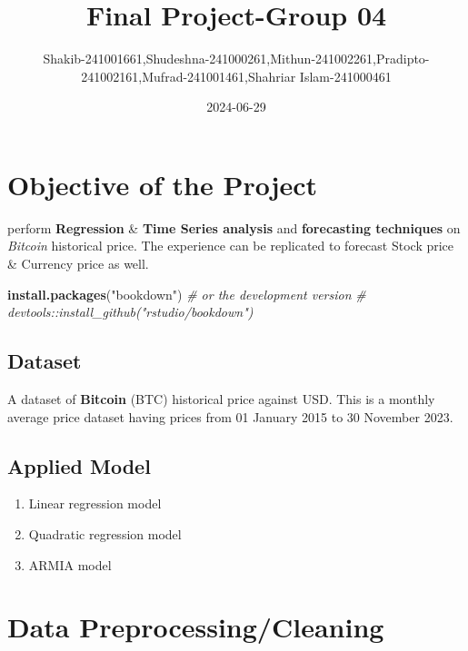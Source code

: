 \documentclass[
]{book}
\title{Final Project-Group 04}
\author{Shakib-241001661,Shudeshna-241000261,Mithun-241002261,Pradipto-241002161,Mufrad-241001461,Shahriar Islam-241000461}
\date{2024-06-29}
\newenvironment{Shaded}{\begin{snugshade}}{\end{snugshade}}
\newcommand{\CommentTok}[1]{\textcolor[rgb]{0.56,0.35,0.01}{\textit{#1}}}
\newcommand{\FunctionTok}[1]{\textcolor[rgb]{0.13,0.29,0.53}{\textbf{#1}}}
\newcommand{\NormalTok}[1]{#1}
\newcommand{\StringTok}[1]{\textcolor[rgb]{0.31,0.60,0.02}{#1}}
\providecommand{\tightlist}{%
  \setlength{\itemsep}{0pt}\setlength{\parskip}{0pt}}
\begin{document}
\maketitle

{
\setcounter{tocdepth}{1}
\tableofcontents
}
\chapter*{Objective of the Project}\label{objective-of-the-project}

perform \textbf{Regression} \& \textbf{Time Series analysis} and \textbf{forecasting techniques} on \emph{Bitcoin} historical price. The experience can be replicated to forecast Stock price \& Currency price as well.

\begin{Shaded}
\begin{Highlighting}[]
\FunctionTok{install.packages}\NormalTok{(}\StringTok{"bookdown"}\NormalTok{)}
\CommentTok{\# or the development version}
\CommentTok{\# devtools::install\_github("rstudio/bookdown")}
\end{Highlighting}
\end{Shaded}

\section*{Dataset}\label{dataset}

A dataset of \textbf{Bitcoin} (BTC) historical price against USD. This is a monthly average price dataset having prices from 01 January 2015 to 30 November 2023.

\section*{Applied Model}\label{applied-model}

\begin{enumerate}
\def\labelenumi{\arabic{enumi}.}
\tightlist
\item
  Linear regression model
\item
  Quadratic regression model
\item
  ARMIA model
\end{enumerate}

\chapter{Data Preprocessing/Cleaning}\label{intro}
\end{document}
